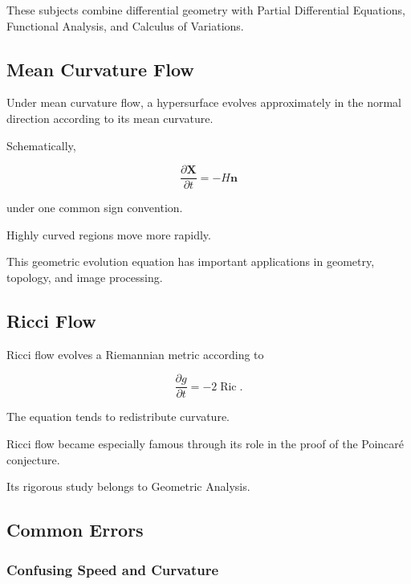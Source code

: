 These subjects combine differential geometry with Partial Differential
Equations, Functional Analysis, and Calculus of Variations.

\subsection{Mean Curvature Flow}
\label{subsec:mean-curvature-flow-preview}

Under mean curvature flow, a hypersurface evolves approximately in the
normal direction according to its mean curvature.

Schematically,

\[
\boxed{
\frac{\partial\mathbf{X}}{\partial t}
=
-H\mathbf{n}
}
\]

under one common sign convention.

Highly curved regions move more rapidly.

This geometric evolution equation has important applications in geometry,
topology, and image processing.

\subsection{Ricci Flow}
\label{subsec:ricci-flow-preview}

Ricci flow evolves a Riemannian metric according to

\[
\boxed{
\frac{\partial g}{\partial t}
=
-2\operatorname{Ric}.
}
\]

The equation tends to redistribute curvature.

Ricci flow became especially famous through its role in the proof of the
Poincar\'e conjecture.

Its rigorous study belongs to Geometric Analysis.

\subsection{Common Errors}
\label{subsec:differential-geometry-common-errors}

\subsubsection{Confusing Speed and Curvature}

